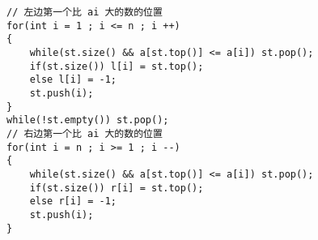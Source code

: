 \documentclass[E:/GsjzTle/main/main.tex]{subfiles}
\begin{document}
\begin{lstlisting}
// 左边第一个比 ai 大的数的位置
for(int i = 1 ; i <= n ; i ++)
{
	while(st.size() && a[st.top()] <= a[i]) st.pop();
	if(st.size()) l[i] = st.top();
	else l[i] = -1;
	st.push(i);
}
while(!st.empty()) st.pop();
// 右边第一个比 ai 大的数的位置
for(int i = n ; i >= 1 ; i --)
{
	while(st.size() && a[st.top()] <= a[i]) st.pop();
	if(st.size()) r[i] = st.top();
	else r[i] = -1;
	st.push(i);
}
\end{lstlisting}
\end{document}
